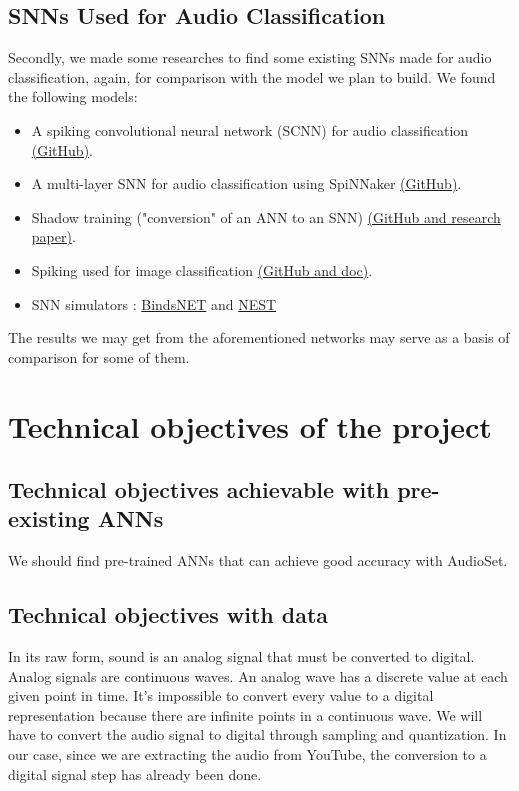\documentclass[11pt]{article}
\begin{document}
\subsection{SNNs Used for Audio Classification}

Secondly, we made some researches to find some existing SNNs made for audio classification, again, for comparison with the model we plan to build.
We found the following models:
\begin{itemize}
  \item A spiking convolutional neural network (SCNN) for audio classification \hyperref[item:SCNN-audio-classification]{(GitHub)}.
  \item A multi-layer SNN for audio classification using SpiNNaker \hyperref[item:spinnaker-audio-classification]{(GitHub)}.
  \item Shadow training ("conversion" of an ANN to an SNN) \hyperref[item:shadow-training]{(GitHub and research paper)}.
  \item Spiking used for image classification \hyperref[item:stereospike]{(GitHub and doc)}.
  \item SNN simulators : \href{item:bindsNET_snntorch-lib}{BindsNET} and \href{item:nest_snntorch-lib}{NEST}
\end{itemize}

The results we may get from the aforementioned networks may serve as a basis of comparison for some of them.


\section{Technical objectives of the project}
\subsection{Technical objectives achievable with pre-existing ANNs}

We should find pre-trained ANNs that can achieve good accuracy with AudioSet.

\subsection{Technical objectives with data}

In its raw form, sound is an analog signal that must be converted to digital. Analog signals are continuous waves. An analog wave has a discrete value at each given point in time. It's impossible to convert every value to a digital representation because there are infinite points in a continuous wave. We will have to convert the audio signal to digital through sampling and quantization. In our case, since we are extracting the audio from YouTube, the conversion to a digital signal step has already been done.
\end{document}
